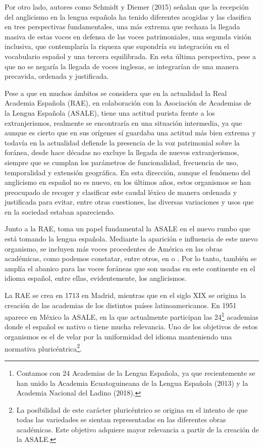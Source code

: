 \documentclass{textolivre}
\begin{document}
Por otro lado, autores como Schmidt y Diemer (2015) señalan que la recepción del anglicismo en la lengua española ha tenido diferentes acogidas y las clasifica en tres perspectivas fundamentales, una más extrema que rechaza la llegada masiva de estas voces en defensa de las voces patrimoniales, una segunda visión inclusiva, que contemplaría la riqueza que supondría su integración en el vocabulario español y una tercera equilibrada. En esta última perspectiva, pese a que no se negaría la llegada de voces inglesas, se integrarían de una manera precavida, ordenada y justificada.

Pese a que en muchos ámbitos se considera que en la actualidad la Real Academia Española (RAE), en colaboración con la Asociación de Academias de la Lengua Española (ASALE), tiene una actitud purista frente a los extranjerismos, realmente se encontraría en una situación intermedia, ya que aunque es cierto que en sus orígenes sí guardaba una actitud más bien extrema y todavía en la actualidad defiende la presencia de la voz patrimonial sobre la foránea, desde hace décadas no excluye la llegada de nuevos extranjerismos, siempre que se cumplan los parámetros de funcionalidad, frecuencia de uso, temporalidad y extensión geográfica. En esta dirección, aunque el fenómeno del anglicismo en español no es nuevo, en los últimos años, estos organismos se han preocupado de recoger y clasificar este caudal léxico de manera ordenada y justificada para evitar, entre otras cuestiones, las diversas variaciones y usos que en la sociedad estaban apareciendo. 

Junto a la RAE, toma un papel fundamental la ASALE en el nuevo rumbo que está tomando la lengua española. Mediante la aparición e influencia de este nuevo organismo, se incluyen más voces procedentes de América en las obras académicas, como podemos constatar, entre otros, en \textcite{morales2006} o \textcite{martin2009}. Por lo tanto, también se amplía el abanico para las voces foráneas que son usadas en este continente en el idioma español, entre ellas, evidentemente, los anglicismos.

La RAE se crea en 1713 en Madrid, mientras que en el siglo XIX se origina la creación de las academias de los distintos países latinoamericanos. En 1951 aparece en México la ASALE, en la que actualmente participan las 24\footnote{
Contamos con 24 Academias de la Lengua Española, ya que recientemente se han unido la Academia Ecuatoguineana de la Lengua Española (2013) y la Academia Nacional del Ladino (2018).
} academias donde el español es nativo o tiene mucha relevancia. Uno de los objetivos de estos organismos es el de velar por la uniformidad del idioma manteniendo una normativa pluricéntrica\footnote{
La posibilidad de este carácter pluricéntrico se origina en el intento de que todas las variedades se sientan representadas en las diferentes obras académicas. Este objetivo adquiere mayor relevancia a partir de la creación de la ASALE.
}.
\end{document}
